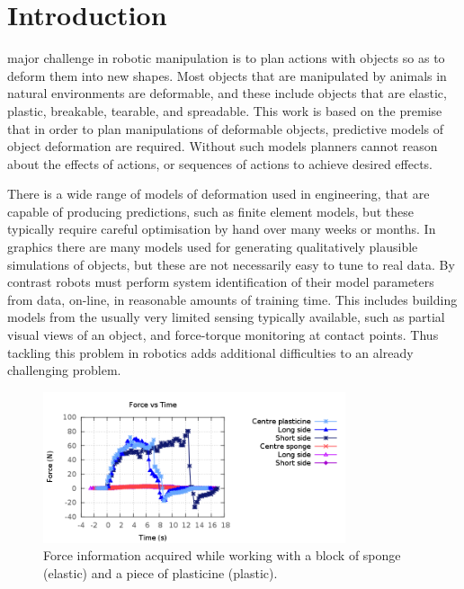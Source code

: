 \documentclass[journal]{IEEEtran}
\begin{document}
\section{Introduction}
% 
% 
% 
% 
 major challenge in robotic manipulation is to plan actions with objects so as to deform them into new shapes. Most objects that are manipulated by animals in natural environments are deformable, and these include objects that are elastic, plastic, breakable, tearable, and spreadable. This work is based on the premise that in order to plan manipulations of deformable objects, predictive models of object deformation are required. Without such models planners cannot reason about the effects of actions, or sequences of actions to achieve desired effects.

There is a wide range of models of deformation used in engineering, that are capable of producing predictions, such as finite element models, but these typically require careful optimisation by hand over many weeks or months. In graphics there are many models used for generating qualitatively plausible simulations of objects, but these are not necessarily easy to tune to real data. By contrast robots must perform system identification of their model parameters from data, on-line, in reasonable amounts of training time. This includes building models from the usually very limited sensing typically available, such as partial visual views of an object, and force-torque monitoring at contact points. Thus tackling this problem in robotics adds additional difficulties to an already challenging problem.

\begin{figure}[!t]
\centering\includegraphics[width=3.5in]{arrio17.png}
\caption{Force information acquired while working with a block of sponge (elastic) and a piece of plasticine (plastic).}
\label{fig:forceElasticPlastic}
\end{figure}
\end{document}
